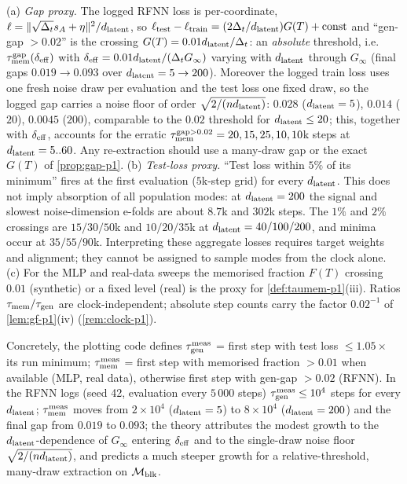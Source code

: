 \begin{remark}\label{rem:proxy-p1}
(a) \emph{Gap proxy.} The logged RFNN loss is per-coordinate, $\ell=\|\sqrt{\Delta_t}s_A+\eta\|^2/d_{\mathrm{latent}}$, so $\ell_{\rm test}-\ell_{\rm train}=(2\Delta_t/d_{\mathrm{latent}})G(T)+{\rm const}$ and ``gen-gap $>0.02$'' is the crossing $G(T)=0.01d_{\mathrm{latent}}/\Delta_t$: an \emph{absolute} threshold, i.e.\ $\tau_{\mathrm{mem}}^{\rm gap}(\delta_{\rm eff})$ with $\delta_{\rm eff}=0.01d_{\mathrm{latent}}/(\Delta_tG_\infty)$ varying with $d_{\mathrm{latent}}$ through $G_\infty$ (final gaps $0.019\to0.093$ over $d_{\mathrm{latent}}=5\to200$). Moreover the logged train loss uses one fresh noise draw per evaluation and the test loss one fixed draw, so the logged gap carries a noise floor of order $\sqrt{2/(nd_{\mathrm{latent}})}$: $0.028$ ($d_{\mathrm{latent}}=5$), $0.014$ ($20$), $0.0045$ ($200$), comparable to the $0.02$ threshold for $d_{\mathrm{latent}}\le20$; this, together with $\delta_{\rm eff}$, accounts for the erratic $\tau_{\mathrm{mem}}^{\rm gap>0.02}=20,15,25,10,10$k steps at $d_{\mathrm{latent}}=5..60$. Any re-extraction should use a many-draw gap or the exact $G(T)$ of \cref{prop:gap-p1}.
(b) \emph{Test-loss proxy.} ``Test loss within $5\%$ of its minimum'' fires at the first evaluation ($5$k-step grid) for every $d_{\mathrm{latent}}$. This does not imply absorption of all population modes: at $d_{\mathrm{latent}}=200$ the signal and slowest noise-dimension e-folds are about $8.7$k and $302$k steps. The $1\%$ and $2\%$ crossings are $15/30/50$k and $10/20/35$k at $d_{\mathrm{latent}}=40/100/200$, and minima occur at $35/55/90$k. Interpreting these aggregate losses requires target weights and alignment; they cannot be assigned to sample modes from the clock alone.
(c) For the MLP and real-data sweeps the memorised fraction $F(T)$ crossing $0.01$ (synthetic) or a fixed level (real) is the proxy for \cref{def:taumem-p1}(iii). Ratios $\tau_{\mathrm{mem}}/\tau_{\mathrm{gen}}$ are clock-independent; absolute step counts carry the factor $0.02^{-1}$ of \cref{lem:gf-p1}(iv) (\cref{rem:clock-p1}).
\end{remark}

\noindent Concretely, the plotting code defines $\tau_{\mathrm{gen}}^{\rm meas}$ = first step with test loss $\le1.05\times$ its run minimum; $\tau_{\mathrm{mem}}^{\rm meas}$ = first step with memorised fraction $>0.01$ when available (MLP, real data), otherwise first step with gen-gap $>0.02$ (RFNN). In the RFNN logs (seed 42, evaluation every $5\,000$ steps) $\tau_{\mathrm{gen}}^{\rm meas}\le10^4$ steps for every $d_{\mathrm{latent}}$; $\tau_{\mathrm{mem}}^{\rm meas}$ moves from $2\times10^4$ ($d_{\mathrm{latent}}=5$) to $8\times10^4$ ($d_{\mathrm{latent}}=200$) and the final gap from $0.019$ to $0.093$; the theory attributes the modest growth to the $d_{\mathrm{latent}}$-dependence of $G_\infty$ entering $\delta_{\rm eff}$ and to the single-draw noise floor $\sqrt{2/(nd_{\mathrm{latent}})}$, and predicts a much steeper growth for a relative-threshold, many-draw extraction on $\mathcal M_{\rm blk}$.

